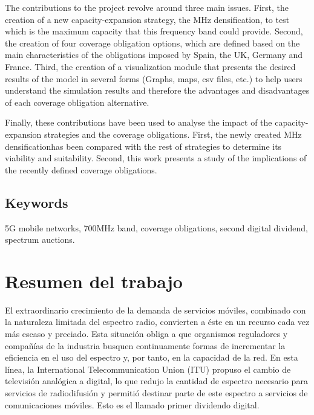 The contributions to the project revolve around three main issues. First, the creation of a new capacity-expansion strategy, the  MHz densification\guillemotright , to test which is the maximum capacity that this frequency band could provide. Second, the creation of four coverage obligation options, which are defined based on the main characteristics of the obligations imposed by Spain, the UK, Germany and France. Third, the creation of a visualization module that presents the desired results of the model in several forms (Graphs, maps, csv files, etc.) to help users understand the simulation results and therefore the advantages and disadvantages of each coverage obligation alternative.\par

Finally, these contributions have been used to analyse the impact of the capacity-expansion strategies and the coverage obligations. First, the newly created  MHz densification\guillemotright  has been compared with the rest of strategies to determine its viability and suitability. Second, this work presents a study of the implications of the recently defined coverage obligations.\par

\section*{Keywords}
5G mobile networks, 700MHz band, coverage obligations, second digital dividend, spectrum auctions. 





\chapter{Resumen del trabajo}

El extraordinario crecimiento de la demanda de servicios móviles, combinado con la naturaleza limitada del espectro radio, convierten a éste en un recurso cada vez más escaso y preciado. Esta situación obliga a que organismos reguladores y compañías de la industria busquen continuamente formas de incrementar la eficiencia en el uso del espectro y, por tanto, en la capacidad de la red. En esta línea, la International Telecommunication Union (ITU) propuso el cambio de televisión analógica a digital, lo que redujo la cantidad de espectro necesario para servicios de radiodifusión y permitió destinar parte de este espectro a servicios de comunicaciones móviles. Esto es el llamado primer dividendo digital.\par

